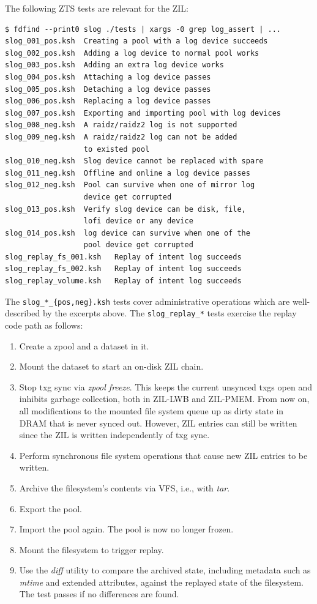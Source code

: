 \documentclass[12pt,a4paper,twoside]{book}
\begin{document}
The following ZTS tests are relevant for the ZIL:
\begin{lstlisting}[style=figurepseudocode]
$ fdfind --print0 slog ./tests | xargs -0 grep log_assert | ...
slog_001_pos.ksh  Creating a pool with a log device succeeds
slog_002_pos.ksh  Adding a log device to normal pool works
slog_003_pos.ksh  Adding an extra log device works
slog_004_pos.ksh  Attaching a log device passes
slog_005_pos.ksh  Detaching a log device passes
slog_006_pos.ksh  Replacing a log device passes
slog_007_pos.ksh  Exporting and importing pool with log devices
slog_008_neg.ksh  A raidz/raidz2 log is not supported
slog_009_neg.ksh  A raidz/raidz2 log can not be added
                  to existed pool
slog_010_neg.ksh  Slog device cannot be replaced with spare
slog_011_neg.ksh  Offline and online a log device passes
slog_012_neg.ksh  Pool can survive when one of mirror log
                  device get corrupted
slog_013_pos.ksh  Verify slog device can be disk, file,
                  lofi device or any device
slog_014_pos.ksh  log device can survive when one of the
                  pool device get corrupted
slog_replay_fs_001.ksh   Replay of intent log succeeds
slog_replay_fs_002.ksh   Replay of intent log succeeds
slog_replay_volume.ksh   Replay of intent log succeeds
\end{lstlisting}
The \lstinline|slog_*_{pos,neg}.ksh| tests cover administrative operations which are well-described by the excerpts above.
The \lstinline{slog_replay_*} tests exercise the replay code path as follows:
\begin{enumerate}[noitemsep]
    \item Create a zpool and a dataset in it.
    \item Mount the dataset to start an on-disk ZIL chain.
    \item Stop txg sync via \textit{zpool freeze}.
        This keeps the current unsynced txgs open and inhibits garbage collection, both in ZIL-LWB and ZIL-PMEM.
        From now on, all modifications to the mounted file system queue up as dirty state in DRAM that is never synced out.
        However, ZIL entries can still be written since the ZIL is written independently of txg sync.
    \item Perform synchronous file system operations that cause new ZIL entries to be written.
    \item Archive the filesystem's contents via VFS, i.e., with \textit{tar}.
    \item Export the pool.
    \item Import the pool again. The pool is now no longer frozen.
    \item Mount the filesystem to trigger replay.
    \item Use the \textit{diff} utility to compare the archived state, including metadata such as \textit{mtime} and extended attributes, against the replayed state of the filesystem.
        The test passes if no differences are found.
\end{enumerate}
\end{document}
